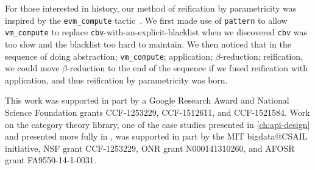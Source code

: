 For those interested in history, our method of reification by parametricity was inspired by the \texttt{evm\_compute} tactic~\cite{MirrorShardITP14}.
We first made use of \texttt{pattern} to allow \texttt{vm\_compute} to replace \texttt{cbv}-with-an-explicit-blacklist when we discovered \texttt{cbv} was too slow and the blacklist too hard to maintain.
We then noticed that in the sequence of doing abstraction; \texttt{vm\_compute}; application; $\beta$-reduction; reification, we could move $\beta$-reduction to the end of the sequence if we fused reification with application, and thus reification by parametricity was born.

This work was supported in part by a Google Research Award and National Science Foundation grants CCF-1253229, CCF-1512611, and CCF-1521584.
Work on the category theory library, one of the case studies presented in \autoref{ch:api-design} and presented more fully in \textcite{category-coq-experience}, was supported in part by the MIT bigdata@CSAIL initiative, NSF grant CCF-1253229, ONR grant N000141310260, and AFOSR grant FA9550-14-1-0031.

